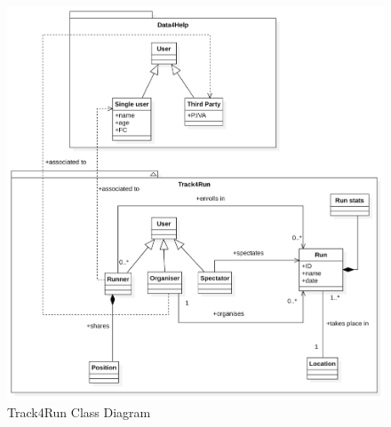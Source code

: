 \documentclass[titlepage]{article}
\begin{document}
		\begin{figure}[ht]
			\center
  			\includegraphics[width=\textwidth]{Diagrammi/T4RClass.png}
  			\caption{Track4Run Class Diagram}
 			\label{fig:T4RClass}
		\end{figure}
		
\end{document}
